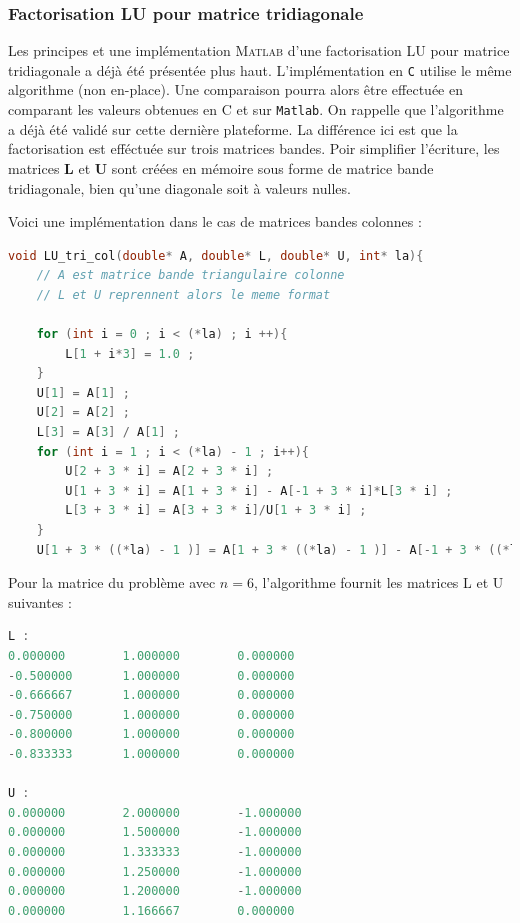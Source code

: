 \documentclass[12pt]{report}
\newcommand{\U}{\mathbf{U}}
\newcommand{\LL}{\mathbf{L}}
\begin{document}
\subsubsection{Factorisation LU pour matrice tridiagonale}

Les principes et une implémentation \textsc{Matlab} d'une factorisation LU pour matrice tridiagonale a déjà été présentée plus haut. L'implémentation en \texttt{C} utilise le même algorithme (non en-place). Une comparaison pourra alors être effectuée en comparant les valeurs obtenues en C et sur \texttt{Matlab}. On rappelle que l'algorithme a déjà été validé sur cette dernière plateforme. La différence ici est que la factorisation est efféctuée sur trois matrices bandes. Poir simplifier l'écriture, les matrices $\LL$ et $\U$ sont créées en mémoire sous forme de matrice bande tridiagonale, bien qu'une diagonale soit à valeurs nulles.

Voici une implémentation dans le cas de matrices bandes colonnes : 

\begin{lstlisting}[language=C, caption=Factorisation LU tridiagonale]
void LU_tri_col(double* A, double* L, double* U, int* la){
	// A est matrice bande triangulaire colonne
	// L et U reprennent alors le meme format 
	
	for (int i = 0 ; i < (*la) ; i ++){
		L[1 + i*3] = 1.0 ; 
	}	
	U[1] = A[1] ; 
	U[2] = A[2] ; 
	L[3] = A[3] / A[1] ; 
	for (int i = 1 ; i < (*la) - 1 ; i++){
		U[2 + 3 * i] = A[2 + 3 * i] ; 
		U[1 + 3 * i] = A[1 + 3 * i] - A[-1 + 3 * i]*L[3 * i] ; 
		L[3 + 3 * i] = A[3 + 3 * i]/U[1 + 3 * i] ; 
	}	 
	U[1 + 3 * ((*la) - 1 )] = A[1 + 3 * ((*la) - 1 )] - A[-1 + 3 * ((*la) - 1 )]*L[3 * ((*la) - 1 )] ;
\end{lstlisting}


Pour la matrice du problème avec $n=6$, l'algorithme fournit les matrices L et U suivantes : 

\begin{lstlisting}[language=C, caption=Factorisation LU tridiagonale]
L : 
0.000000        1.000000        0.000000
-0.500000       1.000000        0.000000
-0.666667       1.000000        0.000000
-0.750000       1.000000        0.000000
-0.800000       1.000000        0.000000
-0.833333       1.000000        0.000000

U :
0.000000        2.000000        -1.000000
0.000000        1.500000        -1.000000
0.000000        1.333333        -1.000000
0.000000        1.250000        -1.000000
0.000000        1.200000        -1.000000
0.000000        1.166667        0.000000
\end{lstlisting}
\end{document}
